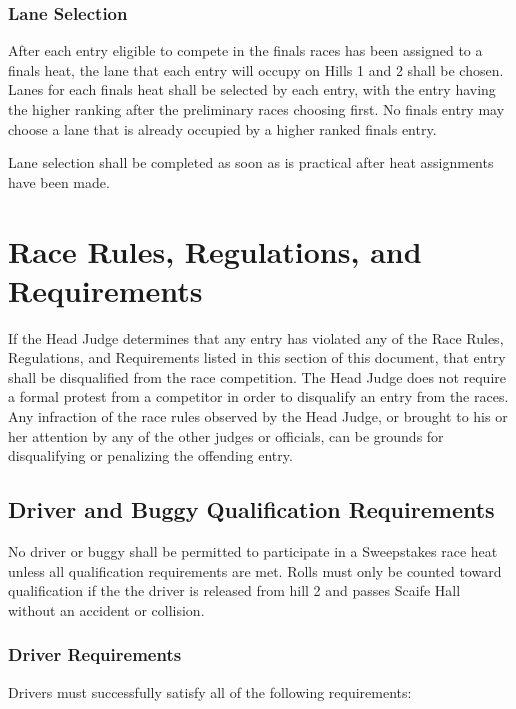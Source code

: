 \subsubsection{Lane Selection}

	After each entry eligible to compete in the finals races has been assigned to a
	finals heat, the lane that each entry will occupy on Hills 1 and 2 shall be
	chosen. Lanes for each finals heat shall be selected by each entry, with the
	entry having the higher ranking after the preliminary races choosing first. No
	finals entry may choose a lane that is already occupied by a higher ranked
	finals entry.

	Lane selection shall be completed as soon as is practical after heat
	assignments have been made.

\section{Race Rules, Regulations, and Requirements}

	If the Head Judge determines that any entry has violated any of the Race Rules,
	Regulations, and Requirements listed in this section of this document, that
	entry shall be disqualified from the race competition. The Head Judge does not
	require a formal protest from a competitor in order to disqualify an entry from
	the races. Any infraction of the race rules observed by the Head Judge, or
	brought to his or her attention by any of the other judges or officials, can be
	grounds for disqualifying or penalizing the offending entry.


\subsection{Driver and Buggy Qualification Requirements}
	No driver or buggy shall be permitted to participate in a Sweepstakes race heat 
	unless all qualification requirements are met. Rolls must only be counted toward 
	qualification if the the driver is released from hill 2 and passes Scaife Hall 
	without an accident or collision.

\subsubsection{Driver Requirements}
Drivers must successfully satisfy all of the following requirements: 

